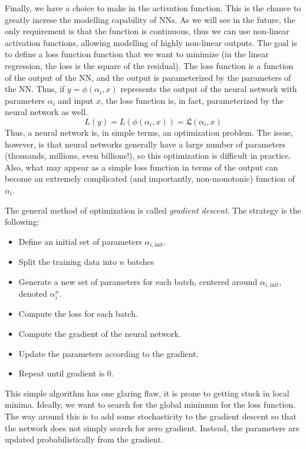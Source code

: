 Finally, we have a choice to make in the activation function. This is the chance to greatly increse the modelling capability of NNs. As we will see in the future, the only requirement is that the function is continuous, thus we can use non-linear activation functions, allowing modelling of highly non-linear outputs. The goal is to define a loss function function that we want to minimize (in the linear regression, the loss is the square of the residual). The loss function is a function of the output of the NN, and the output is parameterized by the parameters of the NN. Thus, if $y=\phi(\alpha_i,x)$ represents the output of the neural network with parameters $\alpha_i$ and input $x$, the loss function is, in fact, parameterized by the neural network as well.
\begin{equation}
	L(y) = L(\phi(\alpha_i,x)) = \mathfrak{L}(\alpha_i,x)
\end{equation}
Thus, a neural network is, in simple terms, an optimization problem. The issue, however, is that neural networks generally have a large number of parameters (thousands, millions, even billions!), so this optimization is difficult in practice. Also, what may appear as a simple loss function in terms of the output can become an extremely complicated (and importantly, non-monotonic) function of $\alpha_i$.

The general method of optimization is called \textit{gradient descent}. The strategy is the following:
\begin{itemize}
	\item Define an initial set of parameters $\alpha_{i,\mathrm{init}}$.
	\item Split the training data into $n$ batches
	\item Generate a new set of parameters for each batch, centered around $\alpha_{i,\mathrm{init}}$, denoted $\alpha^{n}_{i}$.
	\item Compute the loss for each batch.
	\item Compute the gradient of the neural network.
	\item Update the parameters according to the gradient.
	\item Repeat until gradient is 0.
\end{itemize}
This simple algorithm has one glaring flaw, it is prone to getting stuck in local minima. Ideally, we want to search for the global minimum for the loss function. The way around this is to add some stochasticity to the gradient descent so that the network does not simply search for zero gradient. Instead, the parameters are updated probabilistically from the gradient.

